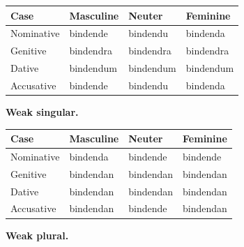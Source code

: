 \par\begingroup
\fontsize{10.5}{13.2}\selectfont
\setlength{\LTleft}{0pt}\setlength{\LTright}{\fill}
\noindent
\begin{tabular}{@{}>{\raggedright\arraybackslash}p{22.0mm}>{\raggedright\arraybackslash}p{31.188mm}>{\raggedright\arraybackslash}p{31.188mm}>{\raggedright\arraybackslash}p{31.188mm}@{}}
\toprule
\textbf{Case} & \textbf{Masculine} & \textbf{Neuter} & \textbf{Feminine} \\
\midrule
Nominative & bindende & bindendu & bindenda \\
Genitive & bindendra & bindendra & bindendra \\
Dative & bindendum & bindendum & bindendum \\
Accusative & bindende & bindendu & bindenda \\
\bottomrule
\end{tabular}
\par\endgroup
\textbf{Weak singular.}

\par\begingroup
\fontsize{10.5}{13.2}\selectfont
\setlength{\LTleft}{0pt}\setlength{\LTright}{\fill}
\noindent
\begin{tabular}{@{}>{\raggedright\arraybackslash}p{22.0mm}>{\raggedright\arraybackslash}p{31.188mm}>{\raggedright\arraybackslash}p{31.188mm}>{\raggedright\arraybackslash}p{31.188mm}@{}}
\toprule
\textbf{Case} & \textbf{Masculine} & \textbf{Neuter} & \textbf{Feminine} \\
\midrule
Nominative & bindenda & bindende & bindende \\
Genitive & bindendan & bindendan & bindendan \\
Dative & bindendan & bindendan & bindendan \\
Accusative & bindendan & bindende & bindendan \\
\bottomrule
\end{tabular}
\par\endgroup
\textbf{Weak plural.}

